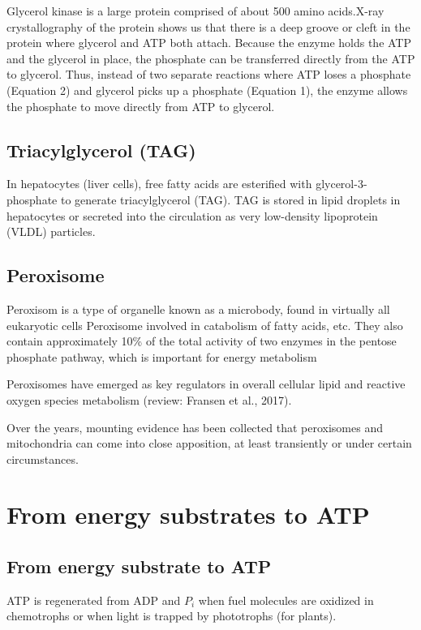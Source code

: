 Glycerol kinase is a large protein comprised of about 500 amino acids.X-ray
crystallography of the protein shows us that there is a deep groove or cleft in
the protein where glycerol and ATP both attach. Because the enzyme holds the ATP
and the glycerol in place, the phosphate can be transferred directly from the
ATP to glycerol.
Thus, instead of two separate reactions where ATP loses a phosphate (Equation 2)
and glycerol picks up a phosphate (Equation 1), the enzyme allows the phosphate
to move directly from ATP to glycerol.

\section{Triacylglycerol (TAG)}
\label{sec:triacylglycerol}

In hepatocytes (liver cells), free fatty acids are esterified with
glycerol-3-phosphate to generate triacylglycerol (TAG). TAG is stored in lipid
droplets in hepatocytes or secreted into the circulation as very low-density
lipoprotein (VLDL) particles.


\section{Peroxisome}
\label{sec:peroxisome}


Peroxisom is a type of organelle  known as a microbody, found in virtually all
eukaryotic cells Peroxisome  involved in catabolism of fatty acids, etc.
They also contain approximately 10\% of the total activity of two enzymes in the
pentose phosphate pathway, which is important for energy metabolism

Peroxisomes have emerged as key regulators in overall cellular lipid
and reactive oxygen species metabolism (review: Fransen et al., 2017).

Over the years, mounting evidence has been collected that peroxisomes and
mitochondria can come into close apposition, at least transiently or under
certain circumstances.

\chapter{From energy substrates to ATP}

\section{From energy substrate to ATP}

ATP is regenerated from ADP and $P_i$ when fuel molecules are oxidized in
chemotrophs or when light is trapped by phototrophs (for plants).

